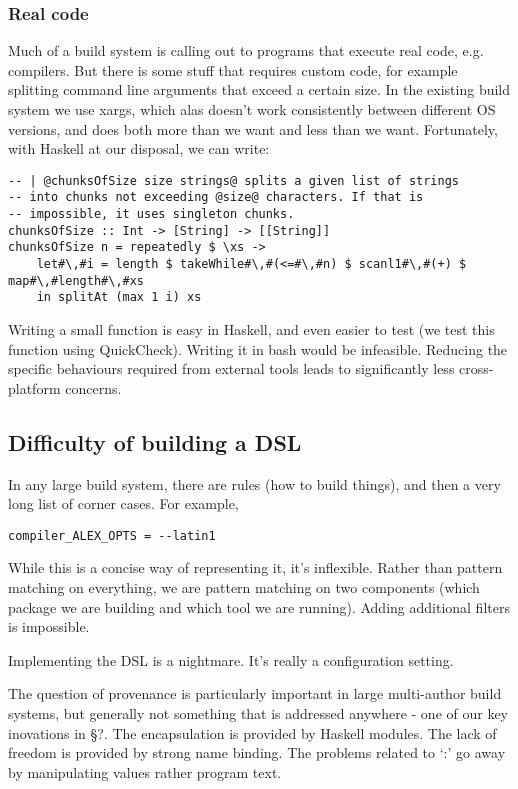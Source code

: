 \subsubsection{Real code}

Much of a build system is calling out to programs that execute real code, e.g. compilers. But there is some stuff that requires custom code, for example splitting command line arguments that exceed a certain size. In the existing build system we use xargs, which alas doesn't work consistently between different OS versions, and does both more than we want and less than we want. Fortunately, with Haskell at our disposal, we can write:

\begin{lstlisting}
-- | @chunksOfSize size strings@ splits a given list of strings
-- into chunks not exceeding @size@ characters. If that is
-- impossible, it uses singleton chunks.
chunksOfSize :: Int -> [String] -> [[String]]
chunksOfSize n = repeatedly $ \xs ->
    let#\,#i = length $ takeWhile#\,#(<=#\,#n) $ scanl1#\,#(+) $ map#\,#length#\,#xs
    in splitAt (max 1 i) xs
\end{lstlisting}

Writing a small function is easy in Haskell, and even easier to test (we test this function using QuickCheck). Writing it in bash would be infeasible. Reducing the specific behaviours required from external tools leads to significantly less cross-platform concerns.

\subsection{Difficulty of building a DSL}

In any large build system, there are rules (how to build things), and then a very long list of corner cases. For example,

\begin{lstlisting}
compiler_ALEX_OPTS = --latin1
\end{lstlisting}

While this is a concise way of representing it, it's inflexible. Rather than pattern matching on everything, we are pattern matching on two components (which package we are building and which tool we are running). Adding additional filters is impossible.

Implementing the DSL is a nightmare. It's really a configuration setting.


The question of provenance is particularly important in large multi-author build systems, but generally not something that is addressed anywhere - one of our key inovations in \S?. The encapsulation is provided by Haskell modules. The lack of freedom is provided by strong name binding. The problems related to `:' go away by manipulating values rather program text.


